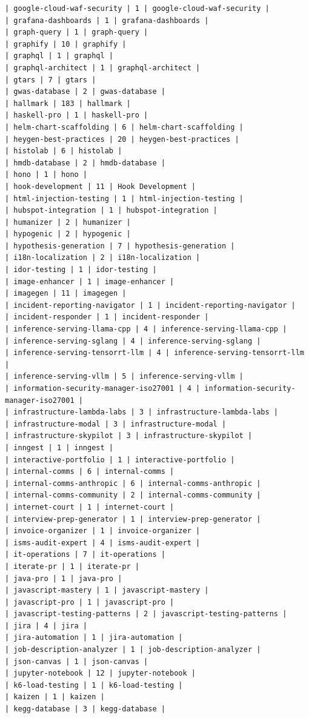 \begin{Verbatim}[breaklines,breakanywhere,fontsize=\footnotesize]
| google-cloud-waf-security | 1 | google-cloud-waf-security |
| grafana-dashboards | 1 | grafana-dashboards |
| graph-query | 1 | graph-query |
| graphify | 10 | graphify |
| graphql | 1 | graphql |
| graphql-architect | 1 | graphql-architect |
| gtars | 7 | gtars |
| gwas-database | 2 | gwas-database |
| hallmark | 183 | hallmark |
| haskell-pro | 1 | haskell-pro |
| helm-chart-scaffolding | 6 | helm-chart-scaffolding |
| heygen-best-practices | 20 | heygen-best-practices |
| histolab | 6 | histolab |
| hmdb-database | 2 | hmdb-database |
| hono | 1 | hono |
| hook-development | 11 | Hook Development |
| html-injection-testing | 1 | html-injection-testing |
| hubspot-integration | 1 | hubspot-integration |
| humanizer | 2 | humanizer |
| hypogenic | 2 | hypogenic |
| hypothesis-generation | 7 | hypothesis-generation |
| i18n-localization | 2 | i18n-localization |
| idor-testing | 1 | idor-testing |
| image-enhancer | 1 | image-enhancer |
| imagegen | 11 | imagegen |
| incident-reporting-navigator | 1 | incident-reporting-navigator |
| incident-responder | 1 | incident-responder |
| inference-serving-llama-cpp | 4 | inference-serving-llama-cpp |
| inference-serving-sglang | 4 | inference-serving-sglang |
| inference-serving-tensorrt-llm | 4 | inference-serving-tensorrt-llm |
| inference-serving-vllm | 5 | inference-serving-vllm |
| information-security-manager-iso27001 | 4 | information-security-manager-iso27001 |
| infrastructure-lambda-labs | 3 | infrastructure-lambda-labs |
| infrastructure-modal | 3 | infrastructure-modal |
| infrastructure-skypilot | 3 | infrastructure-skypilot |
| inngest | 1 | inngest |
| interactive-portfolio | 1 | interactive-portfolio |
| internal-comms | 6 | internal-comms |
| internal-comms-anthropic | 6 | internal-comms-anthropic |
| internal-comms-community | 2 | internal-comms-community |
| internet-court | 1 | internet-court |
| interview-prep-generator | 1 | interview-prep-generator |
| invoice-organizer | 1 | invoice-organizer |
| isms-audit-expert | 4 | isms-audit-expert |
| it-operations | 7 | it-operations |
| iterate-pr | 1 | iterate-pr |
| java-pro | 1 | java-pro |
| javascript-mastery | 1 | javascript-mastery |
| javascript-pro | 1 | javascript-pro |
| javascript-testing-patterns | 2 | javascript-testing-patterns |
| jira | 4 | jira |
| jira-automation | 1 | jira-automation |
| job-description-analyzer | 1 | job-description-analyzer |
| json-canvas | 1 | json-canvas |
| jupyter-notebook | 12 | jupyter-notebook |
| k6-load-testing | 1 | k6-load-testing |
| kaizen | 1 | kaizen |
| kegg-database | 3 | kegg-database |

\end{Verbatim}
